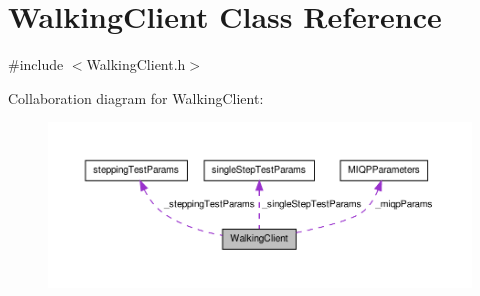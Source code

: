 \hypertarget{classWalkingClient}{\section{\-Walking\-Client \-Class \-Reference}
\label{classWalkingClient}
}


{\ttfamily \#include $<$\-Walking\-Client.\-h$>$}



\-Collaboration diagram for \-Walking\-Client\-:\nopagebreak
\begin{figure}[H]
\begin{center}
\leavevmode
\includegraphics[width=350pt]{classWalkingClient__coll__graph}
\end{center}
\end{figure}
